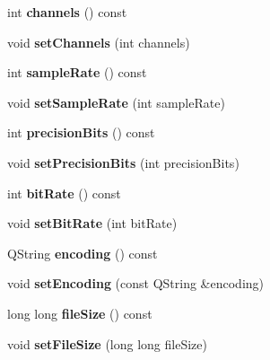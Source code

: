 \begin{DoxyCompactItemize}
int {\bfseries channels} () const
\item 
\mbox{\label{class_corpus_recording_ae6d357b09f72910ba14b8ed42f364cba}} 
void {\bfseries set\+Channels} (int channels)
\item 
\mbox{\label{class_corpus_recording_a2eb1a4954a0cdf996a6a5c003d90af17}} 
int {\bfseries sample\+Rate} () const
\item 
\mbox{\label{class_corpus_recording_a3f88508e17242b42253ef283c34de558}} 
void {\bfseries set\+Sample\+Rate} (int sample\+Rate)
\item 
\mbox{\label{class_corpus_recording_acd4b8a16d8383ab6e9fc3955657b1e4d}} 
int {\bfseries precision\+Bits} () const
\item 
\mbox{\label{class_corpus_recording_a8d414dc7f3175fb239cb53a9db1e6bc4}} 
void {\bfseries set\+Precision\+Bits} (int precision\+Bits)
\item 
\mbox{\label{class_corpus_recording_a098e056795c73ef7e2e55b6ad423c8a1}} 
int {\bfseries bit\+Rate} () const
\item 
\mbox{\label{class_corpus_recording_a0bce882cf34131dac826edf97177398d}} 
void {\bfseries set\+Bit\+Rate} (int bit\+Rate)
\item 
\mbox{\label{class_corpus_recording_a217854a9ac94194163275ae59395d9f5}} 
Q\+String {\bfseries encoding} () const
\item 
\mbox{\label{class_corpus_recording_a4d785a2a267e2ccbd78d3a7fcf263343}} 
void {\bfseries set\+Encoding} (const Q\+String \&encoding)
\item 
\mbox{\label{class_corpus_recording_a072ad6cde836c102c0c3fce45b9edfa3}} 
long long {\bfseries file\+Size} () const
\item 
\mbox{\label{class_corpus_recording_a4cb620a0f52f09719377a3443d27c000}} 
void {\bfseries set\+File\+Size} (long long file\+Size)

\end{DoxyCompactItemize}
